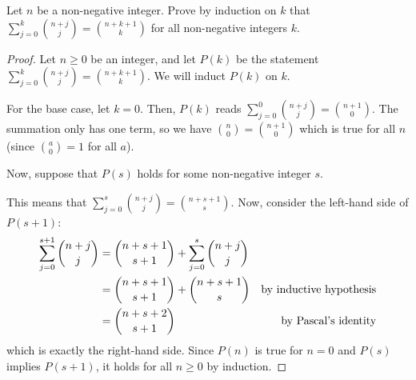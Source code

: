\documentclass{agony}
\begin{document}
\question Let $n$ be a non-negative integer.
Prove by induction on $k$ that $\sum^k_{j=0}\binom{n+j}{j} = \binom{n+k+1}{k}$
for all non-negative integers $k$.
\begin{proof}
  Let $n \geq 0$ be an integer, and let $P(k)$ be the statement $\sum^k_{j=0}\binom{n+j}{j} = \binom{n+k+1}{k}$.
  We will induct $P(k)$ on $k$.

  For the base case, let $k=0$.
  Then, $P(k)$ reads $\sum^0_{j=0}\binom{n+j}{j} = \binom{n+1}{0}$.
  The summation only has one term, so we have $\binom{n}{0} = \binom{n+1}{0}$ which is true for all $n$ (since $\binom{a}{0} = 1$ for all $a$).

  Now, suppose that $P(s)$ holds for some non-negative integer $s$.

  This means that $\sum^s_{j=0}\binom{n+j}{j} = \binom{n+s+1}{s}$.
  Now, consider the left-hand side of $P(s+1)$:
  \begin{align*}
    \sum^{s+1}_{j=0}\binom{n+j}{j}
     & = \binom{n+s+1}{s+1} + \sum^s_{j=0}\binom{n+j}{j} \\
     & = \binom{n+s+1}{s+1} + \binom{n+s+1}{s} & \text{by inductive hypothesis}       \\
     & = \binom{n+s+2}{s+1} & \text{by Pascal's identity}
  \end{align*}
  which is exactly the right-hand side.
  Since $P(n)$ is true for $n=0$ and $P(s)$ implies $P(s+1)$, it holds for all $n \geq 0$ by induction.
\end{proof}
\end{document}
